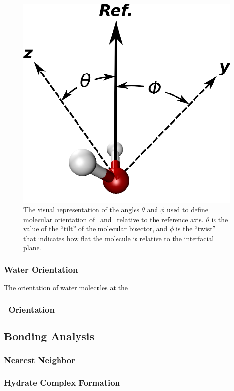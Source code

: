 \begin{figure}[h!]
	\begin{center}
		\includegraphics[scale=1.0]{images/wateranglessmall.png}
		\caption{The visual representation of the angles $\theta$ and $\phi$ used to define molecular orientation of \suldiox~and \wat~relative to the reference axis. $\theta$ is the value of the ``tilt'' of the molecular bisector, and $\phi$ is the ``twist'' that indicates how flat the molecule is relative to the interfacial plane.}
		\label{fig:water-angles}
	\end{center}
\end{figure}

\subsubsection{Water Orientation}
The orientation of water molecules at the 

\subsubsection{\suldiox~Orientation}

\subsection{Bonding Analysis}
\subsubsection{Nearest Neighbor}
\subsubsection{Hydrate Complex Formation}
